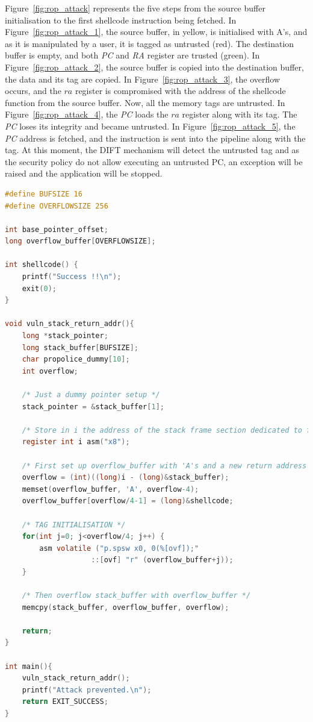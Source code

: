 Figure~\ref{fig:rop_attack} represents the five steps from the source buffer initialisation to the first shellcode instruction being fetched.
In Figure~\ref{fig:rop_attack_1}, the source buffer, in yellow, is initialised with A's, and as it is manipulated by a user, it is tagged as untrusted (red). The destination buffer is empty, and both \textit{PC} and \textit{RA} register are trusted (green).
In Figure~\ref{fig:rop_attack_2}, the source buffer is copied into the destination buffer, the data and its tag are copied.
In Figure~\ref{fig:rop_attack_3}, the overflow occurs, and the $ra$ register is compromised with the address of the shellcode function from the source buffer. Now, all the memory tags are untrusted.
In Figure~\ref{fig:rop_attack_4}, the \textit{PC} loads the $ra$ register along with its tag. The \textit{PC} loses its integrity and became untrusted.
In Figure~\ref{fig:rop_attack_5}, the \textit{PC} address is fetched, and the instruction is sent into the pipeline along with the tag.
At this moment, the DIFT mechanism will detect the untrusted tag and as the security policy do not allow executing an untrusted PC, an exception will be raised and the application will be stopped.

\begin{lstlisting}[style=topPosition, language=C, label=code:buffer_overflow, caption=Buffer overflow C code]
#define BUFSIZE 16
#define OVERFLOWSIZE 256

int base_pointer_offset;
long overflow_buffer[OVERFLOWSIZE];

int shellcode() {
    printf("Success !!\n");
    exit(0);
}

void vuln_stack_return_addr(){
    long *stack_pointer;
    long stack_buffer[BUFSIZE];
    char propolice_dummy[10];
    int overflow;
    
    /* Just a dummy pointer setup */
    stack_pointer = &stack_buffer[1];
    
    /* Store in i the address of the stack frame section dedicated to function arguments */
    register int i asm("x8");  
    
    /* First set up overflow_buffer with 'A's and a new return address */
    overflow = (int)((long)i - (long)&stack_buffer);
    memset(overflow_buffer, 'A', overflow-4);
    overflow_buffer[overflow/4-1] = (long)&shellcode;

    /* TAG INITIALISATION */
    for(int j=0; j<overflow/4; j++) {
        asm volatile ("p.spsw x0, 0(%[ovf]);"                
                    ::[ovf] "r" (overflow_buffer+j));
    }

    /* Then overflow stack_buffer with overflow_buffer */
    memcpy(stack_buffer, overflow_buffer, overflow); 
    
    return;
}

int main(){
    vuln_stack_return_addr();
    printf("Attack prevented.\n");
    return EXIT_SUCCESS;
}\end{lstlisting}

